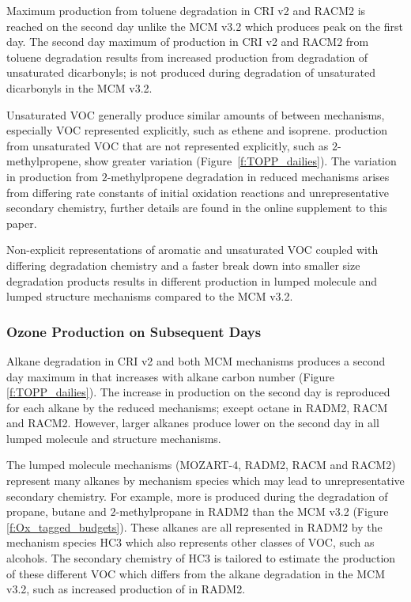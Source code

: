 Maximum  production from toluene degradation in CRI v2 and RACM2 is reached on the second day unlike the MCM v3.2 which produces peak  on the first day.
The second day maximum of  production in CRI v2 and RACM2 from toluene degradation results from increased  production from degradation of unsaturated dicarbonyls;  is not produced during degradation of unsaturated dicarbonyls in the MCM v3.2.

Unsaturated VOC generally produce similar amounts of  between mechanisms, especially VOC represented explicitly, such as ethene and isoprene.
 production from unsaturated VOC that are not represented explicitly, such as $2$-methylpropene, show greater variation \mbox{(Figure \ref{f:TOPP_dailies}).}
The variation in  production from $2$-methylpropene degradation in reduced mechanisms arises from differing rate constants of initial oxidation reactions and unrepresentative secondary chemistry, further details are found in the online supplement to this paper.

Non-explicit representations of aromatic and unsaturated VOC coupled with differing degradation chemistry and a faster break down into smaller size degradation products results in different  production in lumped molecule and lumped structure mechanisms compared to the MCM v3.2.
%
\subsubsection{Ozone Production on Subsequent Days} \label{sss:profiles} %
%
Alkane degradation in CRI v2 and both MCM mechanisms produces a second day maximum in  that increases with alkane carbon number (Figure \ref{f:TOPP_dailies}).
The increase in  production on the second day is reproduced for each alkane by the reduced mechanisms; except octane in RADM2, RACM and RACM2.
However, larger alkanes produce lower  on the second day in all lumped molecule and structure mechanisms.

The lumped molecule mechanisms (MOZART-4, RADM2, RACM and RACM2) represent many alkanes by mechanism species which may lead to unrepresentative secondary chemistry.
For example, more  is produced during the degradation of propane, butane and $2$-methylpropane in RADM2 than the MCM v3.2 (Figure \ref{f:Ox_tagged_budgets}).
These alkanes are all represented in RADM2 by the mechanism species HC3 which also represents other classes of VOC, such as alcohols.
The secondary chemistry of HC3 is tailored to estimate the  production of these different VOC which differs from the alkane degradation in the MCM v3.2, such as increased production of  in RADM2.

